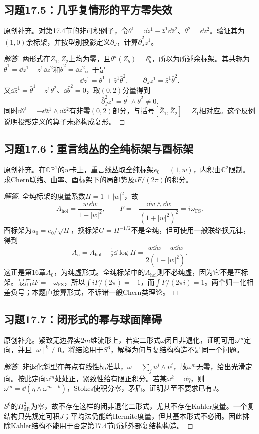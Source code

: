 \subsection*{习题17.5：几乎复情形的平方零失效}
原创补充。对第17.4节的非可积例子，令$\theta^1=\dd z^1-\bar z^1\dd\bar z^2$、$\theta^2=\dd z^2$。验证其为$(1,0)$余标架，并按型别投影定义$\bar\partial_J$，计算$\bar\partial_J^2z^1$。
\begin{proof}[解答]
两形式在$\bar Z_1,\bar Z_2$上均为零，且$\theta^a(Z_b)=\delta^a_b$，所以为所述余标架。其共轭为$\bar\theta^1=\dd\bar z^1-z^1\dd z^2$和$\bar\theta^2=\dd\bar z^2$。于是
\[
 \dd z^1=\theta^1+\bar z^1\bar\theta^2,\qquad
 \bar\partial_Jz^1=\bar z^1\bar\theta^2.
\]
又$\dd\bar z^1=\bar\theta^1+z^1\theta^2$、$\dd\bar\theta^2=0$，取$(0,2)$分量得到
\[
 \bar\partial_J^2z^1=\bar\theta^1\wedge\bar\theta^2\ne0.
\]
同时$\dd\theta^1=-\dd\bar z^1\wedge\dd\bar z^2$有非零$(0,2)$部分，与括号$[\bar Z_1,\bar Z_2]=Z_1$相对应。这个反例说明投影定义的算子未必构成复形。
\end{proof}

\subsection*{习题17.6：重言线丛的全纯标架与酉标架}
原创补充。在$\mathbb{CP}^1$的$w$卡上，重言线丛取全纯标架$e_0=(1,w)$，内积由$\mathbb C^2$限制。求Chern联络、曲率、酉标架下的局部势及$iF/(2\pi)$的积分。
\begin{proof}[解答]
全纯标架的度量系数$H=1+|w|^2$，故
\[
 A_{\mathrm{hol}}=\frac{\bar w\,\dd w}{1+|w|^2},\qquad
 F=-\frac{\dd w\wedge\dd\bar w}{(1+|w|^2)^2}=i\omega_{\mathrm{FS}}.
\]
酉标架为$u_0=e_0/\sqrt H$，换标架$G=H^{-1/2}$不是全纯，但可使用一般联络换元律，得到
\[
 A_u=A_{\mathrm{hol}}-\tfrac12\dd\log H
 =\frac{\bar w\dd w-w\dd\bar w}{2(1+|w|^2)}.
\]
这正是第16章$A_0$，为纯虚形式。全纯标架中的$A_{\mathrm{hol}}$则不必纯虚，因为它不是酉标架。最后$iF=-\omega_{\mathrm{FS}}$，所以$\int iF/(2\pi)=-1$，而$\int F/(2\pi i)=1$。两个归一化相差负号；本题直接算形式，不诉诸一般Chern类理论。
\end{proof}

\subsection*{习题17.7：闭形式的幂与球面障碍}
原创补充。紧致无边界实$2m$维流形上，若实二形式$\omega$闭且非退化，证明可用$\omega^m$定向，并且$[\omega]^k\ne0$。将结论用于$S^6$，解释为何与复结构构造不是同一个问题。
\begin{proof}[解答]
非退化斜型在每点有线性标准基，$\omega=\sum_j u^j\wedge v^j$，故$\omega^m$无零，给出光滑定向。按此定向$\omega^m$处处正，紧致性给有限正积分。若某$\omega^k=\dd\eta$，则$\omega^m=\dd(\eta\wedge\omega^{m-k})$，Stokes使积分零，矛盾。证明甚至不要求已有$J$。

$S^6$的$H^2_{\mathrm{dR}}$为零，故不存在这样的闭非退化二形式，尤其不存在Kahler度量。一个复结构只先规定可积$J$；平均法仍能给Hermite度量，但其基本形式不必闭。因此排除Kahler结构不能用于否定第17.4节所述外部复结构构造。
\end{proof}

